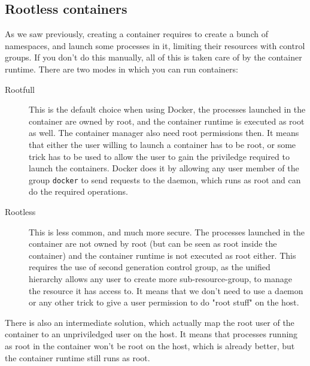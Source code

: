 \subsection{Rootless containers}
As we saw previously, creating a container requires to create a bunch of namespaces, and launch some processes in it, limiting their resources with control groups.  If you don't do this manually, all of this is taken care of by the container runtime.  There are two modes in which you can run containers:
\begin{description}
  \item[Rootfull]  This is the default choice when using Docker, the processes launched in the container are owned by root, and the container runtime is executed as root as well.  The container manager also need root permissions then.  It means that either the user willing to launch a container has to be root, or some trick has to be used to allow the user to gain the priviledge required to launch the containers.  Docker does it by allowing any user member of the group \texttt{docker} to send requests to the daemon, which runs as root and can do the required operations.
  \item[Rootless] This is less common, and much more secure.  The processes launched in the container are not owned by root (but can be seen as root inside the container) and the container runtime is not executed as root either.  This requires the use of second generation control group, as the unified hierarchy allows any user to create more sub-resource-group, to manage the resource it has access to.  It means that we don't need to use a daemon or any other trick to give a user permission to do "root stuff" on the host.
\end{description}
There is also an intermediate solution, which actually map the root user of the container to an unpriviledged user on the host.  It means that processes running as root in the container won't be root on the host, which is already better, but the container runtime still runs as root.

